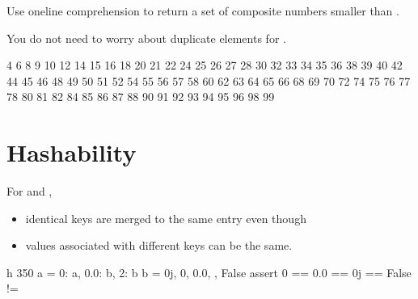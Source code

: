 \documentclass[letterpaper,10pt,english]{sphinxmanual}
\begin{document}
 Use one\sphinxhyphen{}line comprehension to return a set of composite numbers smaller than .

 You do not need to worry about duplicate elements for .

\begin{sphinxVerbatim}[commandchars=\\\{\}]
 
             
    
\end{sphinxVerbatim}

\begin{sphinxVerbatim}[commandchars=\\\{\}]
4 6 8 9 10 12 14 15 16 18 20 21 22 24 25 26 27 28 30 32 33 34 35 36 38 39 40 42 44 45 46 48 49 50 51 52 54 55 56 57 58 60 62 63 64 65 66 68 69 70 72 74 75 76 77 78 80 81 82 84 85 86 87 88 90 91 92 93 94 95 96 98 99
\end{sphinxVerbatim}


\section{Hashability}
\label{\detokenize{Lecture8/Dictionaries and Sets:hashability}}
For  and ,
\begin{itemize}
\item {} 
identical keys are merged to the same entry even though

\item {} 
values associated with different keys can be the same.

\end{itemize}

\begin{sphinxVerbatim}[commandchars=\\\{\}]
 \PYGZhy{}h 350
a = \PYGZob{}0: \PYGZsq{}a\PYGZsq{}, 0.0: \PYGZsq{}b\PYGZsq{}, 2: \PYGZsq{}b\PYGZsq{}\PYGZcb{}
b = \PYGZob{}0j, 0, 0.0, \PYGZsq{}\PYGZsq{}, False\PYGZcb{}
assert 0 == 0.0 == 0j == False != \PYGZsq{}\PYGZsq{}
\end{sphinxVerbatim}
\end{document}
